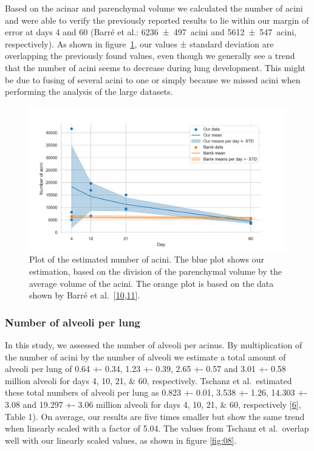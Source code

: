 \documentclass[
  american,
]{article}
\begin{document}
Based on the acinar and parenchymal volume we calculated the number of acini and were able to verify the previously reported results to lie within our margin of error at days 4 and 60 (Barré et al.: 6236~±~497~acini and 5612~±~547~acini, respectively).
As shown in figure~\ref{fig:07}, our values ± standard deviation are overlapping the previously found values, even though we generally see a trend that the number of acini seems to decrease during lung development.
This might be due to fusing of several acini to one or simply because we missed acini when performing the analysis of the large datasets.

\begin{figure}
\hypertarget{fig:07}{%
\centering
\includegraphics{images/fig07.png}
\caption{Plot of the estimated number of acini.
The blue plot shows our estimation, based on the division of the parenchymal volume by the average volume of the acini.
The orange plot is based on the data shown by Barré et al.~{[}\protect\hyperlink{ref-14OP85b2F}{10},\protect\hyperlink{ref-uFNlWogb}{11}{]}.}\label{fig:07}
}
\end{figure}

\hypertarget{number-of-alveoli-per-lung-1}{%
\subsubsection{Number of alveoli per lung}\label{number-of-alveoli-per-lung-1}}

In this study, we assessed the number of alveoli per acinus.
By multiplication of the number of acini by the number of alveoli we estimate a total amount of alveoli per lung of 0.64 +- 0.34, 1.23 +- 0.39, 2.65 +- 0.57 and 3.01 +- 0.58 million alveoli for days 4, 10, 21, \& 60, respectively.
Tschanz et al.~estimated these total numbers of alveoli per lung as 0.823 +- 0.01, 3.538 +- 1.26, 14.303 +- 3.08 and 19.297 +- 3.06 million alveoli for days 4, 10, 21, \& 60, respectively {[}\protect\hyperlink{ref-wnl86DEM}{6}{]}, Table 1).
On average, our results are five times smaller but show the same trend when linearly scaled with a factor of 5.04.
The values from Tschanz et al.~overlap well with our linearly scaled values, as shown in figure \ref{fig:08}.
\end{document}
